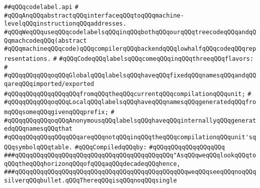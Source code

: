 \label{src/lib/compiler/back/low/code/codelabel.api}
\verb|##qQQqcodelabel.api|\newline
\verb|#|\newline
\verb|#qQQqAnqQQqabstractqQQqinterfaceqQQqtoqQQqmachine-levelqQQqinstructionqQQqaddresses.|\newline
\verb|#qQQqWeqQQquseqQQqcodelabelsqQQqinqQQqbothqQQqourqQQqtreecodeqQQqandqQQqmachcodeqQQq(abstract|\newline
\verb|#qQQqmachineqQQqcode)qQQqcompilerqQQqbackendqQQqlowhalfqQQqcodeqQQqrepresentations.|\newline
\verb|#|\newline
\verb|#qQQqCodeqQQqlabelsqQQqcomeqQQqinqQQqthreeqQQqflavors:|\newline
\verb|#|\newline
\verb|#qQQqqQQqqQQqoqQQqGlobalqQQqlabelsqQQqhaveqQQqfixedqQQqnamesqQQqandqQQqareqQQqimported/exported|\newline
\verb|#qQQqqQQqqQQqqQQqqQQqfromqQQqtheqQQqcurrentqQQqcompilationqQQqunit;|\newline
\verb|#|\newline
\verb|#qQQqqQQqqQQqoqQQqLocalqQQqlabelsqQQqhaveqQQqnamesqQQqgeneratedqQQqfromqQQqsomeqQQqgivenqQQqprefix;|\newline
\verb|#|\newline
\verb|#qQQqqQQqqQQqoqQQqAnonymousqQQqlabelsqQQqhaveqQQqinternallyqQQqgeneratedqQQqnamesqQQqthat|\newline
\verb|#qQQqqQQqqQQqqQQqqQQqareqQQqnotqQQqinqQQqtheqQQqcompilationqQQqunit'sqQQqsymbolqQQqtable.|\newline
\newline
\verb|#qQQqCompiledqQQqby:|\newline
\verb|#qQQqqQQqqQQqqQQqqQQq|\newline
\newline
\newline
\newline
\newline
\newline
\newline
\newline
\verb|###qQQqqQQqqQQqqQQqqQQqqQQqqQQqqQQqqQQqqQQqqQQq"AsqQQqweqQQqlookqQQqtoqQQqtheqQQqhorizonqQQqofqQQqaqQQqdecadeqQQqhence,|\newline
\verb|###qQQqqQQqqQQqqQQqqQQqqQQqqQQqqQQqqQQqqQQqqQQqqQQqweqQQqseeqQQqnoqQQqsilverqQQqbullet.qQQqThereqQQqisqQQqnoqQQqsingle|\newline
